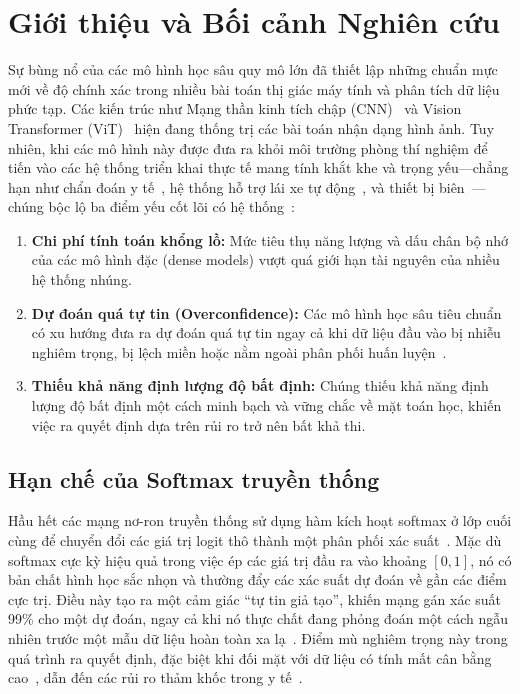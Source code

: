 \documentclass[11pt, a4paper]{article}
\begin{document}
\section{Giới thiệu và Bối cảnh Nghiên cứu}\label{sec:intro}

Sự bùng nổ của các mô hình học sâu quy mô lớn đã thiết lập những chuẩn mực mới về độ chính xác trong nhiều bài toán thị giác máy tính và phân tích dữ liệu phức tạp. Các kiến trúc như Mạng thần kinh tích chập (CNN)~\cite{he2016deep} và Vision Transformer (ViT)~\cite{dosovitskiy2021image} hiện đang thống trị các bài toán nhận dạng hình ảnh. Tuy nhiên, khi các mô hình này được đưa ra khỏi môi trường phòng thí nghiệm để tiến vào các hệ thống triển khai thực tế mang tính khắt khe và trọng yếu---chẳng hạn như chẩn đoán y tế~\cite{esteva2017dermatologist}, hệ thống hỗ trợ lái xe tự động~\cite{grigorescu2020survey}, và thiết bị biên~\cite{deng2020edge}---chúng bộc lộ ba điểm yếu cốt lõi có hệ thống~\cite{abdar2021review}:

\begin{enumerate}
    \item \textbf{Chi phí tính toán khổng lồ:} Mức tiêu thụ năng lượng và dấu chân bộ nhớ của các mô hình đặc (dense models) vượt quá giới hạn tài nguyên của nhiều hệ thống nhúng.
    \item \textbf{Dự đoán quá tự tin (Overconfidence):} Các mô hình học sâu tiêu chuẩn có xu hướng đưa ra dự đoán quá tự tin ngay cả khi dữ liệu đầu vào bị nhiễu nghiêm trọng, bị lệch miền hoặc nằm ngoài phân phối huấn luyện~\cite{guo2017calibration}.
    \item \textbf{Thiếu khả năng định lượng độ bất định:} Chúng thiếu khả năng định lượng độ bất định một cách minh bạch và vững chắc về mặt toán học, khiến việc ra quyết định dựa trên rủi ro trở nên bất khả thi.
\end{enumerate}

\subsection{Hạn chế của Softmax truyền thống}

Hầu hết các mạng nơ-ron truyền thống sử dụng hàm kích hoạt softmax ở lớp cuối cùng để chuyển đổi các giá trị logit thô thành một phân phối xác suất~\cite{guo2017calibration, minderer2021revisiting}. Mặc dù softmax cực kỳ hiệu quả trong việc ép các giá trị đầu ra vào khoảng $[0, 1]$, nó có bản chất hình học sắc nhọn và thường đẩy các xác suất dự đoán về gần các điểm cực trị. Điều này tạo ra một cảm giác ``tự tin giả tạo'', khiến mạng gán xác suất 99\% cho một dự đoán, ngay cả khi nó thực chất đang phỏng đoán một cách ngẫu nhiên trước một mẫu dữ liệu hoàn toàn xa lạ~\cite{lakshminarayanan2017simple}. Điểm mù nghiêm trọng này trong quá trình ra quyết định, đặc biệt khi đối mặt với dữ liệu có tính mất cân bằng cao~\cite{johnson2019survey}, dẫn đến các rủi ro thảm khốc trong y tế~\cite{begoli2019need}.
\end{document}
